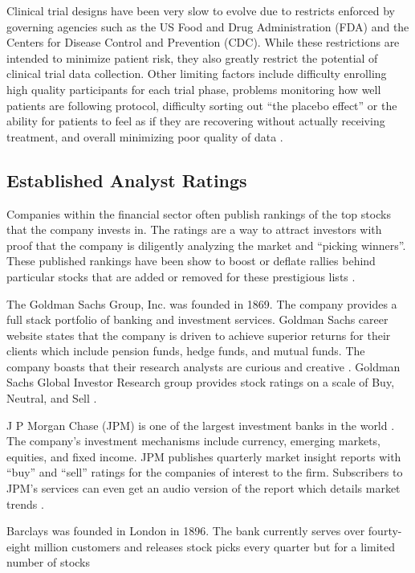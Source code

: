 \documentclass[sigconf]{acmart}
\begin{document}
Clinical trial designs have been very slow to evolve due to restricts enforced by governing agencies such as the US Food and Drug Administration (FDA) and the Centers for Disease Control and Prevention (CDC). While these restrictions are intended to minimize patient risk, they also greatly restrict the potential of clinical trial data collection. Other limiting factors include  difficulty enrolling high quality participants for each trial phase, problems monitoring how well patients are following protocol, difficulty sorting out ``the placebo effect'' or the ability for patients to feel as if they are recovering without actually receiving treatment, and overall minimizing poor quality of data \cite{Friedman}. 

\subsection{Established Analyst Ratings}
Companies within the financial sector often publish rankings of the top stocks that the company invests in. The ratings are a way to attract investors with proof that the company is diligently analyzing the market and ``picking winners''. These published rankings have been show to boost or deflate rallies behind particular stocks that are added or removed for these prestigious lists \cite{www-seekAnalyst}. 

The Goldman Sachs Group, Inc. was founded in 1869. The company provides a full stack portfolio of banking and investment services. Goldman Sachs career website states that the company is driven to achieve superior returns for their clients which include pension funds, hedge funds, and mutual funds. The company boasts that their research analysts are curious and creative \cite{www-gldmanGlance}. Goldman Sachs Global Investor Research group provides stock ratings on a scale of Buy, Neutral, and Sell \cite{www-goldmanTicker}. 

J P Morgan Chase (JPM) is one of the largest investment banks in the world \cite{www-investBanks}. The company's investment mechanisms include currency, emerging markets, equities, and fixed income. JPM publishes quarterly market insight reports with ``buy'' and ``sell'' ratings for the companies of interest to the firm. Subscribers to JPM's services can even get an audio version of the report which details market trends \cite{www-JPM}.

Barclays was founded in London in 1896. The bank currently serves over fourty-eight million customers and releases stock picks every quarter but for a limited number of stocks
\end{document}

